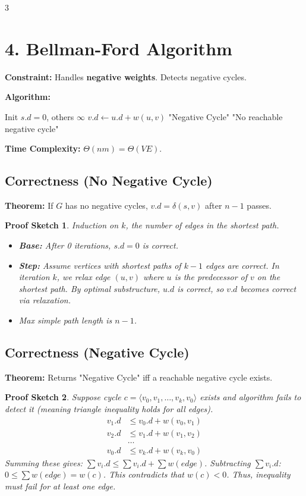 \documentclass[10pt, a4paper, landscape]{article}
\newtheorem*{proof_sketch}{Proof Sketch}
\begin{document}
\begin{multicols}{3}
\section*{4. Bellman-Ford Algorithm}
\textbf{Constraint:} Handles \textbf{negative weights}. Detects negative cycles.

\textbf{Algorithm:}
\begin{algorithmic}[1]
\State Init $s.d=0$, others $\infty$
            \State $v.d \gets u.d + w(u, v)$
        \EndIf
    \EndFor
\EndFor
{}
        \Return "Negative Cycle"
    \EndIf
\EndFor
\Return "No reachable negative cycle"
\end{algorithmic}

\textbf{Time Complexity:} $\Theta(nm) = \Theta(VE)$.

\subsection*{Correctness (No Negative Cycle)}
\textbf{Theorem:} If $G$ has no negative cycles, $v.d = \delta(s, v)$ after $n-1$ passes.
\begin{proof_sketch}
Induction on $k$, the number of edges in the shortest path.
\begin{itemize}[leftmargin=*]
    \item \textbf{Base:} After 0 iterations, $s.d=0$ is correct.
    \item \textbf{Step:} Assume vertices with shortest paths of $k-1$ edges are correct. In iteration $k$, we relax edge $(u, v)$ where $u$ is the predecessor of $v$ on the shortest path. By optimal substructure, $u.d$ is correct, so $v.d$ becomes correct via relaxation.
    \item Max simple path length is $n-1$.
\end{itemize}
\end{proof_sketch}

\subsection*{Correctness (Negative Cycle)}
\textbf{Theorem:} Returns "Negative Cycle" iff a reachable negative cycle exists.
\begin{proof_sketch}
Suppose cycle $c = \langle v_0, v_1, \dots, v_k, v_0 \rangle$ exists and algorithm fails to detect it (meaning triangle inequality holds for all edges).
\begin{align*}
    v_1.d &\le v_0.d + w(v_0, v_1) \\
    v_2.d &\le v_1.d + w(v_1, v_2) \\
    &\dots \\
    v_0.d &\le v_k.d + w(v_k, v_0)
\end{align*}
Summing these gives: $\sum v_i.d \le \sum v_i.d + \sum w(edge)$.
Subtracting $\sum v_i.d$: $0 \le \sum w(edge) = w(c)$.
This contradicts that $w(c) < 0$. Thus, inequality must fail for at least one edge.
\end{proof_sketch}


\end{multicols}
\end{document}
